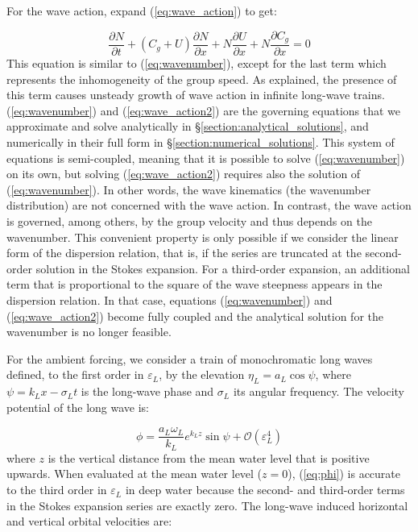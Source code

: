 \documentclass[lineno]{jfm}
\begin{document}
For the wave action, expand (\ref{eq:wave_action}) to get:

\begin{equation}
\label{eq:wave_action2}
\dfrac{\partial N}{\partial t}
+ \left(C_g + U\right) \dfrac{\partial N}{\partial x}
+ N \dfrac{\partial U}{\partial x}
+ N \dfrac{\partial C_g}{\partial x}
= 0
\end{equation}
This equation is similar to (\ref{eq:wavenumber}), except for the last term
which represents the inhomogeneity of the group speed.
As \citet{peureux2021unsteady} explained, the presence of this term causes
unsteady growth of wave action in infinite long-wave trains.
(\ref{eq:wavenumber}) and (\ref{eq:wave_action2}) are the governing equations
that we approximate and solve analytically in \S\ref{section:analytical_solutions},
and numerically in their full form in \S\ref{section:numerical_solutions}.
This system of equations is semi-coupled, meaning that
it is possible to solve (\ref{eq:wavenumber}) on its own, but solving
(\ref{eq:wave_action2}) requires also the solution of (\ref{eq:wavenumber}).
In other words, the wave kinematics (the wavenumber distribution) are not
concerned with the wave action.
In contrast, the wave action is governed, among others, by the
group velocity and thus depends on the wavenumber.
This convenient property is only possible if we consider the linear form
of the dispersion relation, that is, if the series are truncated at the
second-order solution in the Stokes expansion.
For a third-order expansion, an additional term that is proportional to the
square of the wave steepness appears in the dispersion relation.
In that case, equations (\ref{eq:wavenumber}) and (\ref{eq:wave_action2})
become fully coupled and the analytical solution for the wavenumber is no longer
feasible.

For the ambient forcing, we consider a train of monochromatic long waves
defined, to the first order in $\varepsilon_L$, by the elevation
$\eta_L = a_L \cos{\psi}$, where $\psi = k_L x - \sigma_L t$ is the long-wave
phase and $\sigma_L$ its angular frequency.
The velocity potential of the long wave is:

\begin{equation}
\label{eq:phi}
\phi = \dfrac{a_L \omega_L}{k_L} e^{k_L z} \sin{\psi} + \mathcal{O}(\varepsilon_L^4)
\end{equation}
where $z$ is the vertical distance from the mean water level that is positive
upwards.
When evaluated at the mean water level ($z=0$), (\ref{eq:phi}) is accurate to
the third order in $\varepsilon_L$ in deep water because the second- and
third-order terms in the Stokes expansion series are exactly zero.
The long-wave induced horizontal and vertical orbital velocities are:
\end{document}
